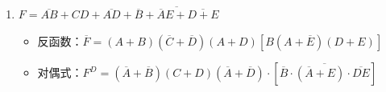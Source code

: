 \documentclass[10pt, a4paper]{article}
\begin{document}
{\begin{enumerate}
    \item $F = \overline{AB} + CD + \overline{AD} + \overline{\overline{B} + \overline{A}E + \overline{D + E}}$
    \begin{itemize}
        \item 反函数：$\overline{F} = (A + B)(\overline{C} + \overline{D})(A + D)[B(A + \overline{E})(D + E)]$
        \item 对偶式：$F^D = (\overline{A} + \overline{B})(C + D)(\overline{A} + \overline{D}) \cdot [\overline{\overline{B} \cdot (\overline{A} + E) \cdot \overline{DE}}]$
    \end{itemize}
\end{enumerate}
}
\end{document}
